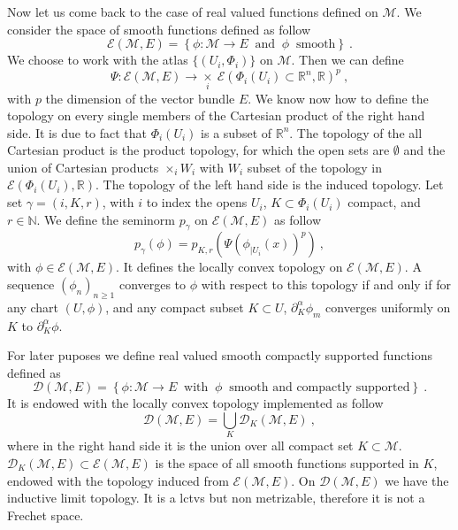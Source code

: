 \documentclass[10pt]{book}
\newcommand{\Dcal}{\mathcal{D}}
\newcommand{\Ecal}{\mathcal{E}}
\newcommand{\Mcal}{\mathcal{M}}
\newcommand{\Nbb}{\mathbb{N}}
\newcommand{\Rbb}{\mathbb{R}}
\theoremstyle{break}
\begin{document}
\bigskip

Now let us come back to the case of real valued functions defined on $\Mcal$. We consider the space of smooth functions defined as follow
%
\begin{equation*}
\Ecal(\Mcal,E) = \left\{ \phi : \Mcal \to E \ \mbox{ and } \ \phi \ \mbox{ smooth} \right\} \ .
\end{equation*}
%
We choose to work with the atlas $\{(U_i,\Phi_i)\}$ on $\Mcal$. Then we can define
%
\begin{equation*}
\Psi : \Ecal(\Mcal,E) \to \underset{i}{\times} \ \Ecal\left(\Phi_i(U_i) \subset \Rbb^n , \Rbb \right)^p \ ,
\end{equation*}
%
with $p$ the dimension of the vector bundle $E$. We know now how to define the topology on every single members of the Cartesian product of the right hand side. It is due to fact that $\Phi_i(U_i)$ is a subset of $\Rbb^n$. The topology of the all Cartesian product is the product topology, for which the open sets are $\emptyset$ and the union of Cartesian products $\times_i W_i$ with $W_i$ subset of the topology in $ \Ecal\left(\Phi_i(U_i) , \Rbb \right)$. The topology of the left hand side is the induced topology. Let set $\gamma = (i, K, r)$, with $i$ to index the opens $U_i$, $K \subset \Phi_i(U_i)$ compact, and $r \in \Nbb$. We define the seminorm $p_\gamma$ on $\Ecal(\Mcal,E)$ as follow
%
\begin{equation*}
p_\gamma(\phi) = p_{K,r}\left( \Psi\left( \phi_{|U_i}(x) \right)^p \right) \ ,
\end{equation*}
%
with $\phi \in \Ecal\left(\Mcal , E \right)$. It defines the locally convex topology on $\Ecal\left(\Mcal , E \right)$. A sequence $(\phi_n)_{n\geq 1}$ converges to $\phi$ with respect to this topology if and only if for any chart $(U,\phi)$, and any compact subset $K \subset U$, $\partial^\alpha_K \phi_m$ converges uniformly on $K$ to $\partial^\alpha_K \phi$.


\bigskip


For later puposes we define real valued smooth compactly supported functions defined as
%
\begin{equation*}
\Dcal(\Mcal,E) = \left\{ \phi : \Mcal \to E \ \mbox{ with } \ \phi \ \mbox{ smooth and compactly supported} \right\} \ .
\end{equation*}
%
It is endowed with the locally convex topology implemented as follow
%
\begin{equation*}
\Dcal(\Mcal,E) = \bigcup_{K} \Dcal_K(\Mcal,E) \ ,
\end{equation*}
%
where in the right hand side it is the union over all compact set $K \subset \Mcal$. $\Dcal_K(\Mcal,E) \subset \Ecal(\Mcal,E)$ is the space of all smooth functions supported in $K$, endowed with the topology induced from $\Ecal(\Mcal,E)$. On $\Dcal(\Mcal,E)$ we have the inductive limit topology. It is a lctvs but non metrizable, therefore it is not a Frechet space. 
\end{document}
